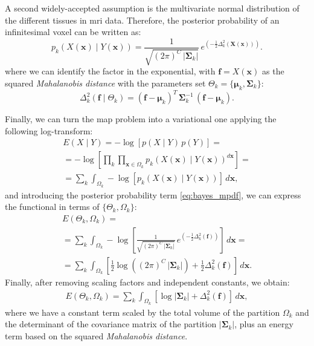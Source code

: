A second widely-accepted assumption is the multivariate normal 
distribution of the different tissues in \gls{mri} data. Therefore,
the posterior probability of an infinitesimal voxel
can be written as:
\begin{equation}
p_k( X(\mathbf{x}) \mid Y(\mathbf{x}) ) = \frac{1}{ \sqrt{(2\pi)^{C}\,\left|\boldsymbol{\Sigma}_{k}\right|}}\,{e^{\left(-\frac{1}{2}  \Delta^2_k (\mathbf{X(\mathbf{x})}) \right)}}.
\label{eq:bayes_mpdf}
\end{equation}
where we can identify the factor in the exponential, with 
$\mathbf{f} = X(\mathbf{x})$ as the squared \emph{Mahalanobis 
distance} with the parameters set $\Theta_k = \lbrace \boldsymbol{\mu}_k, \boldsymbol{\Sigma}_k \rbrace$:
\begin{equation}
\Delta^2_k (\mathbf{f} \mid \Theta_k ) = (\mathbf{f} - \boldsymbol{\mu}_k)^T \, \boldsymbol{\Sigma}^{-1}_k \, (\mathbf{f} - \boldsymbol{\mu}_k).
\label{eq:bayes_mahalanobis}
\end{equation}

Finally, we can turn the \gls{map} problem into a variational one
applying the following log-transform:
\begin{multline}
E(X \mid Y)= -\log \left[ p(X \mid Y) \, p(Y) \right] = \\
= -\log \left[ \underset{k}{\prod} \underset{\mathbf{x}\in \Omega_k}{\prod}
p_k( X(\mathbf{x}) \mid Y(\mathbf{x}) )^{d\mathbf{x}} \right] = \\
= \sum\limits_k \int_{\Omega_k} -\log \left[ p_k(X(\mathbf{x}) \mid Y(\mathbf{x} ) ) \right] \, d\mathbf{x},
\label{eq:energy_1}
\end{multline}
and introducing the posterior probability term \eqref{eq:bayes_mpdf}, 
we can express the functional in terms of $\lbrace\Theta_k,\Omega_k\rbrace$:
\begin{multline}
E(\Theta_k,\Omega_k) = \\
= \sum\limits_k \int_{\Omega_k} -\log \left[ \frac{1}{ \sqrt{(2\pi)^{C}\,\left|\boldsymbol{\Sigma}_{k}\right|}}\,{e^{\left(-\frac{1}{2}  \Delta^2_k (\mathbf{f}) \right)}} \right] \, d\mathbf{x} = \\
= \sum\limits_k \int_{\Omega_k} \left[ \frac{1}{2} \log{ \left( (2\pi)^{C}\,\left|\boldsymbol{\Sigma}_{k}\right| \right)} + \frac{1}{2}  \Delta^2_k (\mathbf{f}) \right] \,d\mathbf{x}.
\end{multline}
Finally, after removing scaling factors and independent constants,
we obtain:
\begin{align}
E(\Theta_k,\Omega_k) = \sum\limits_k \int_{\Omega_k} \left[ \log \left|\mathbf{\Sigma}_k\right| + \Delta^2_k (\mathbf{f}) \right] \,d\mathbf{x},
\label{eq:map_energy}
\end{align}
 where we have a constant term scaled by
the total volume of the partition $\Omega_k$ and the determinant of the 
covariance matrix of the partition $\left|\boldsymbol{\Sigma}_{k}\right|$,
plus an energy term based on the squared \emph{Mahalanobis distance}.

